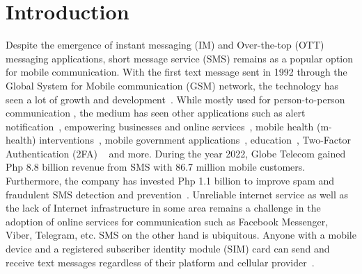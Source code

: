 \documentclass[journal]{./IEEE/IEEEtran}
\title{\SPTITLE}
\author{\ADVISEE~and~\ADVISER%
	\REMARK
}
\begin{document}
	
\maketitle
	



\section{Introduction}
Despite the emergence of instant messaging (IM) and Over-the-top (OTT) 
messaging applications, short message service (SMS) remains as a popular option 
for mobile communication. With the first text message sent in 1992 through the 
Global System for Mobile communication (GSM) network, the technology has seen 
a lot of growth and  development~\cite{LeBodic_2005}. While mostly used for 
person-to-person communication \cite{Herring_Stein_Virtanen_2013}, the medium 
has seen other applications such as alert notification~\cite{Yoo_Lee_Yoo_Xiao_2021,
Azid_Sharma_Raghuwaiya_Chand_Prasad_Jacquier_2015}, 
empowering businesses and online services~\cite{Gargaro_2023, Okazaki_Taylor_2008, 
SecureSMS14}, mobile health (m-health) interventions~\cite{NudgeFlu23, SMSUx22}, 
mobile government applications~\cite{Onashoga_Ogunjobi_Ibharalu_Lawal_2016, EGov13},
education~\cite{Hill_Hill_Sherman_2007}, Two-Factor Authentication (2FA)
~\cite{DynamicOTP} and more. During the year 2022, Globe Telecom gained 
Php 8.8 billion revenue from SMS with 86.7 million mobile customers. 
Furthermore, the company has invested Php 1.1 billion to improve spam and 
fraudulent SMS detection and prevention~\cite{GlobeIR22}. Unreliable internet 
service as well as the lack of Internet infrastructure in some area remains a 
challenge in the adoption of online services for communication such as 
Facebook Messenger, Viber, Telegram, etc. SMS on the other hand is ubiquitous. 
Anyone with a mobile device and a registered subscriber identity module (SIM) 
card can send and receive text messages regardless of their platform and 
cellular provider~\cite{PhilStar}. 
\end{document}
